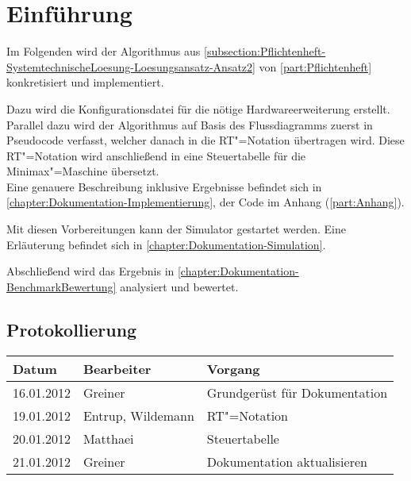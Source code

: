\chapter{Einführung}
\label{chapter:Dokumentation-Einfuehrung}

Im Folgenden wird der Algorithmus aus \autoref{subsection:Pflichtenheft-SystemtechnischeLoesung-Loesungsansatz-Ansatz2} von \autoref{part:Pflichtenheft} konkretisiert und implementiert.

Dazu wird die Konfigurationsdatei für die nötige Hardwareerweiterung erstellt. Parallel dazu wird der Algorithmus auf Basis des Flussdiagramms zuerst in Pseudocode verfasst, welcher danach in die RT"=Notation übertragen wird. Diese RT"=Notation wird anschließend in eine Steuertabelle für die Minimax"=Maschine übersetzt.\\
Eine genauere Beschreibung inklusive Ergebnisse befindet sich in \autoref{chapter:Dokumentation-Implementierung}, der Code im Anhang (\autoref{part:Anhang}).

Mit diesen Vorbereitungen kann der Simulator gestartet werden. Eine Erläuterung befindet sich in \autoref{chapter:Dokumentation-Simulation}.

Abschließend wird das Ergebnis in \autoref{chapter:Dokumentation-BenchmarkBewertung} analysiert und bewertet.


\section{Protokollierung}
\label{section:Dokumentation-Einfuehrung-Protokollierung}

\begin{tabularx}{\textwidth}{|l|l|X|}
    \hline
    Datum & Bearbeiter & Vorgang \\
    \hline
    \hline
    16.01.2012 & Greiner & Grundgerüst für Dokumentation \\
    \hline
    19.01.2012 & Entrup, Wildemann & RT"=Notation \\
    \hline
    20.01.2012 & Matthaei & Steuertabelle \\
    \hline
    21.01.2012 & Greiner & Dokumentation aktualisieren\\
    \hline
\end{tabularx}